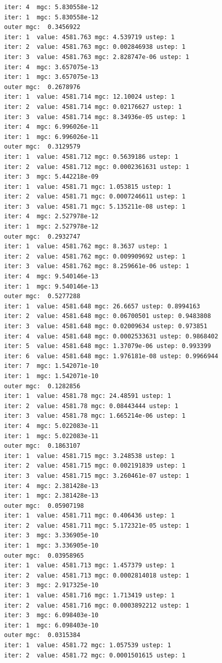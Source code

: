 \documentclass[
  letterpaper,
  DIV=11,
  numbers=noendperiod]{scrartcl}
\begin{document}
\begin{verbatim}
iter: 4  mgc: 5.830558e-12 
iter: 1  mgc: 5.830558e-12 
outer mgc:  0.3456922 
iter: 1  value: 4581.763 mgc: 4.539719 ustep: 1 
iter: 2  value: 4581.763 mgc: 0.002846938 ustep: 1 
iter: 3  value: 4581.763 mgc: 2.828747e-06 ustep: 1 
iter: 4  mgc: 3.657075e-13 
iter: 1  mgc: 3.657075e-13 
outer mgc:  0.2678976 
iter: 1  value: 4581.714 mgc: 12.10024 ustep: 1 
iter: 2  value: 4581.714 mgc: 0.02176627 ustep: 1 
iter: 3  value: 4581.714 mgc: 8.34936e-05 ustep: 1 
iter: 4  mgc: 6.996026e-11 
iter: 1  mgc: 6.996026e-11 
outer mgc:  0.3129579 
iter: 1  value: 4581.712 mgc: 0.5639186 ustep: 1 
iter: 2  value: 4581.712 mgc: 0.0002361631 ustep: 1 
iter: 3  mgc: 5.442218e-09 
iter: 1  value: 4581.71 mgc: 1.053815 ustep: 1 
iter: 2  value: 4581.71 mgc: 0.0007246611 ustep: 1 
iter: 3  value: 4581.71 mgc: 5.135211e-08 ustep: 1 
iter: 4  mgc: 2.527978e-12 
iter: 1  mgc: 2.527978e-12 
outer mgc:  0.2932747 
iter: 1  value: 4581.762 mgc: 8.3637 ustep: 1 
iter: 2  value: 4581.762 mgc: 0.009909692 ustep: 1 
iter: 3  value: 4581.762 mgc: 8.259661e-06 ustep: 1 
iter: 4  mgc: 9.540146e-13 
iter: 1  mgc: 9.540146e-13 
outer mgc:  0.5277288 
iter: 1  value: 4581.648 mgc: 26.6657 ustep: 0.8994163 
iter: 2  value: 4581.648 mgc: 0.06700501 ustep: 0.9483808 
iter: 3  value: 4581.648 mgc: 0.02009634 ustep: 0.973851 
iter: 4  value: 4581.648 mgc: 0.0002533631 ustep: 0.9868402 
iter: 5  value: 4581.648 mgc: 1.37079e-06 ustep: 0.993399 
iter: 6  value: 4581.648 mgc: 1.976181e-08 ustep: 0.9966944 
iter: 7  mgc: 1.542071e-10 
iter: 1  mgc: 1.542071e-10 
outer mgc:  0.1282856 
iter: 1  value: 4581.78 mgc: 24.48591 ustep: 1 
iter: 2  value: 4581.78 mgc: 0.08443444 ustep: 1 
iter: 3  value: 4581.78 mgc: 1.665214e-06 ustep: 1 
iter: 4  mgc: 5.022083e-11 
iter: 1  mgc: 5.022083e-11 
outer mgc:  0.1863107 
iter: 1  value: 4581.715 mgc: 3.248538 ustep: 1 
iter: 2  value: 4581.715 mgc: 0.002191839 ustep: 1 
iter: 3  value: 4581.715 mgc: 3.260461e-07 ustep: 1 
iter: 4  mgc: 2.381428e-13 
iter: 1  mgc: 2.381428e-13 
outer mgc:  0.05907198 
iter: 1  value: 4581.711 mgc: 0.406436 ustep: 1 
iter: 2  value: 4581.711 mgc: 5.172321e-05 ustep: 1 
iter: 3  mgc: 3.336905e-10 
iter: 1  mgc: 3.336905e-10 
outer mgc:  0.03958965 
iter: 1  value: 4581.713 mgc: 1.457379 ustep: 1 
iter: 2  value: 4581.713 mgc: 0.0002814018 ustep: 1 
iter: 3  mgc: 2.917325e-10 
iter: 1  value: 4581.716 mgc: 1.713419 ustep: 1 
iter: 2  value: 4581.716 mgc: 0.0003892212 ustep: 1 
iter: 3  mgc: 6.098403e-10 
iter: 1  mgc: 6.098403e-10 
outer mgc:  0.0315384 
iter: 1  value: 4581.72 mgc: 1.057539 ustep: 1 
iter: 2  value: 4581.72 mgc: 0.0001501615 ustep: 1 

\end{verbatim}
\end{document}
